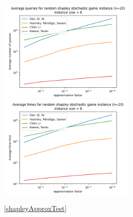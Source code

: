   \vspace{-20pt}
  \begin{figure}[H]
      \centering
      \includegraphics[width=2.6in]{plots/shapley_eps_queries.png}
      \centering
      \includegraphics[width=2.6in]{plots/shapley_eps_times.png}
      \caption{\cref{shapleyApproxTest}} \label{shapleyApproxPlot}
  \end{figure}
